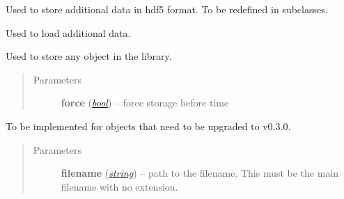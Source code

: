 \documentclass[a4paper,10pt,english]{sphinxmanual}
\begin{document}
\begin{fulllineitems}

\begin{fulllineitems}
\label{api-core:TensorToolbox.core.storable_object.h5store}
Used to store additional data in hdf5 format. To be redefined in subclasses.

\end{fulllineitems}


\begin{fulllineitems}
\label{api-core:TensorToolbox.core.storable_object.load}
Used to load additional data.

\end{fulllineitems}


\begin{fulllineitems}
\label{api-core:TensorToolbox.core.storable_object.store}
Used to store any object in the library.
\begin{quote}\begin{description}
\item[{Parameters}] \leavevmode
\textbf{force} (\href{http://docs.python.org/library/functions.html\#bool}{\emph{bool}}) -- force storage before time

\end{description}\end{quote}

\end{fulllineitems}


\begin{fulllineitems}
\label{api-core:TensorToolbox.core.storable_object.to_v_0_3_0}
To be implemented for objects that need to be upgraded to v0.3.0.
\begin{quote}\begin{description}
\item[{Parameters}] \leavevmode
\textbf{filename} (\href{http://docs.python.org/library/string.html\#module-string}{\emph{string}}) -- path to the filename. This must be the main filename with no extension.

\end{description}\end{quote}

\end{fulllineitems}


\end{fulllineitems}
\end{document}
